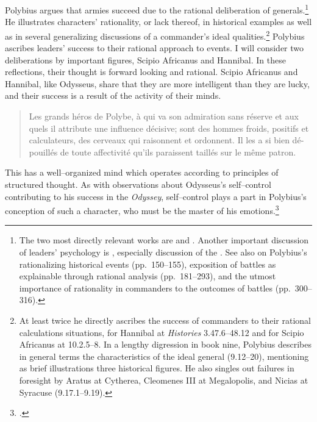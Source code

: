 \documentclass[12pt,letterpaper,oneside,final]{memoir}
\begin{document}
Polybius argues that armies succeed due to the rational deliberation of generals.\footnote{The\label{ft-polyb-biblio} two most directly relevant works are \textcite[][on Polybius's idea of agency, which success hinges on the state of mind and intentions of actor, and how well they assess a situation before doing anything]{podes1990} and \textcite[][on Polybius on ideal general, who wins with superior rationality and tactical knowledge]{poznanski1994}. Another important discussion of leaders' psychology is \textcite[210--229]{pedech1964}, especially discussion of the . See also \textcite[][p.~315, n.~121, considering the former two articles]{levene2010} on Polybius's rationalizing historical events (pp.~150--155), exposition of battles as explainable through rational analysis (pp.~181--293), and the utmost importance of rationality in commanders to the outcomes of battles (pp.~300--316).} He illustrates characters' rationality, or lack thereof, in historical examples as well as in several generalizing discussions of a commander's ideal qualities.\footnote{At least twice he directly ascribes the success of commanders to their rational calculations situations, for Hannibal at \emph{Histories} 3.47.6--48.12 and for Scipio Africanus at 10.2.5--8. In a lengthy digression in book nine, Polybius describes in general terms the characteristics of the ideal general (9.12--20), mentioning as brief illustrations three historical figures. He also singles out failures in foresight by Aratus at Cytherea, Cleomenes III at Megalopolis, and Nicias at Syracuse (9.17.1--9.19).} Polybius ascribes leaders' success to their rational approach to events. I will consider two deliberations by important figures, Scipio Africanus and Hannibal. In these reflections, their thought is forward looking and rational. Scipio Africanus and Hannibal, like Odysseus, share that they are more intelligent than they are lucky, and their success is a result of the activity of their minds. \blockquote[{\cite[216--217]{pedech1964}}]{\textfrench{Les grands héros de Polybe, à qui va son admiration sans réserve et aux quels il attribute une influence décisive; sont des hommes froids, positifs et calculateurs, des cerveaux qui raisonnent et ordonnent. Il les a si bien dépouillés de toute affectivité qu'ils paraissent taillés sur le même patron.}} This  has a well--organized mind which operates according to principles of structured thought. As with observations about Odysseus's self--control contributing to his success in the \emph{Odyssey}, self--control plays a part in Polybius's conception of such a character, who must be the master of his emotions.\footnote{.}
\end{document}
